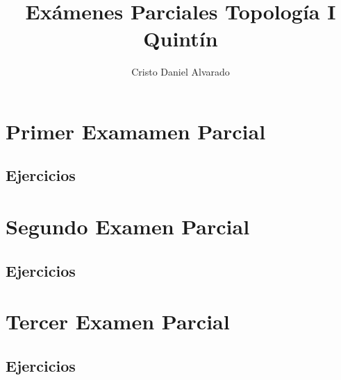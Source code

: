 \documentclass[12pt]{report}
\theoremstyle{largebreak}
\begin{document}
    \setlength{\parskip}{5pt} %
    \setlength{\parindent}{12pt} %
    \title{Exámenes Parciales Topología I Quintín}
    \author{Cristo Daniel Alvarado}
    \maketitle

    \tableofcontents %


    \chapter{Primer Examamen Parcial}

    \section{Ejercicios}

    \begin{excer}
        
    \end{excer}

    \chapter{Segundo Examen Parcial}

    \section{Ejercicios}

    \begin{excer}
        
    \end{excer}

    \chapter{Tercer Examen Parcial}

    \section{Ejercicios}
    
    \begin{excer}
        
    \end{excer}
\end{document}

